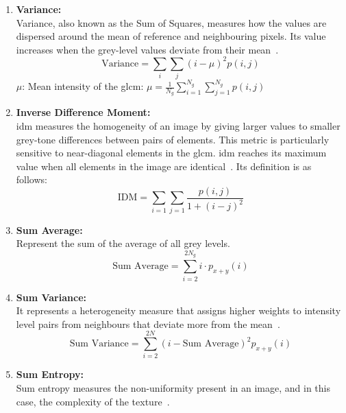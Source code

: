\begin{enumerate}
    \item \textbf{Variance:}\\
    Variance, also known as the Sum of Squares, measures how the values are dispersed around the mean of reference and neighbouring pixels. 
    Its value increases when the grey-level values deviate from their mean~\cite{oprisan_bounds_2023}.
        \begin{equation}
            \text{Variance} = \sum_{i} \sum_{j} (i - \mu)^2 p(i,j)
        \end{equation}
      $\mu$: Mean intensity of the \ac{glcm}: $\mu = \frac{1}{N_g}\sum_{i=1}^{N_g} \sum_{j=1}^{N_g} p(i,j)$ \\
    
    \item \textbf{Inverse Difference Moment:}\\
    \acf{idm} measures the homogeneity of an image by giving larger values to smaller grey-tone differences between pairs of elements. This metric is particularly sensitive to near-diagonal elements in the \ac{glcm}. \ac{idm} reaches its maximum value when all elements in the image are identical~\cite{oprisan_bounds_2023}.
    Its definition is as follows:
        \begin{equation}
            \text{IDM} = \sum_{i=1} \sum_{j=1} \frac{p(i,j)}{1 + (i - j)^2}
        \end{equation}
        
    \item \textbf{Sum Average:}\\
    Represent the sum of the average of all grey levels.
        \begin{equation}
            \text{Sum Average} = \sum_{i=2}^{2N_g} i \cdot p_{x+y}(i)
        \end{equation}
        
    \item \textbf{Sum Variance:}\\
    It represents a heterogeneity measure that assigns higher weights to intensity level pairs from neighbours that deviate more from the mean~\cite{oprisan_bounds_2023}.
        \begin{equation}
            \text{Sum Variance} = \sum_{i=2}^{2N} (i - \text{Sum Average})^2 p_{x+y}(i)
        \end{equation}  
        
    \item \textbf{Sum Entropy:}\\
    Sum entropy measures the non-uniformity present in an image, and in this case, the complexity of the texture~\cite{oprisan_bounds_2023}.
    

\end{enumerate}
